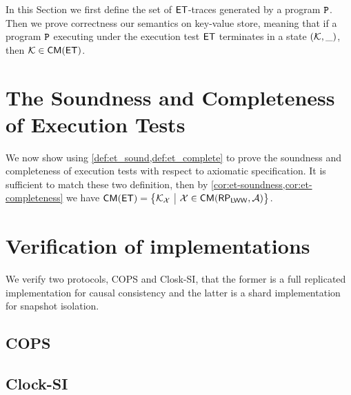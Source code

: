 \documentclass[conference,compsoc]{IEEEtran}
\newcommand{\RootPath}{.}
\begin{document}
In this Section we first define the set of $\mathsf{ET}$-traces generated by a program $\mathtt{P}$. 
Then we prove correctness our semantics on key-value store,
meaning that if a program $\mathtt{P}$ executing under the execution 
test $\mathsf{ET}$ terminates in a state $(\mathcal{K}, \_)$, then $\mathcal{K} \in \mathsf{CM}(\mathsf{ET})$. 





\section{The Soundness and Completeness of Execution Tests}
\label{app:et_sound_complete}
We now show using \cref{def:et_sound,def:et_complete} to prove the soundness and completeness of execution tests with respect to axiomatic specification.
It is sufficient to match these two definition, 
then by \cref{cor:et-soundness,cor:et-completeness} we have \( \CMs(\ET) = \Setcon{\mkvs_\aexec}{\aexec \in \CMa(\RP_\LWW,\Ax)} \).

\label{sec:kv-sound-complete-proof}
\label{sec:spec-proof}













\section{Verification of implementations}

We verify two protocols, COPS and Closk-SI, that the former is a full replicated implementation for causal consistency and the latter is a shard implementation for snapshot isolation.

\subsection{COPS}
\label{sec:cops}


\subsection{Clock-SI}
\label{sec:clock-si}


\end{document}
